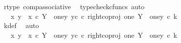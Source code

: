 \begin{isabellebody}
\ r{\isacharunderscore}{\kern0pt}type\ comp{\isacharunderscore}{\kern0pt}associative{}\ \isamarkupfalse%
\ {\isacharparenleft}{\kern0pt}typecheck{\isacharunderscore}{\kern0pt}cfuncs{\isacharcomma}{\kern0pt}\ auto{\isacharparenright}{\kern0pt}\isanewline
\ \ \ \ \ \ \ \ \ \ \ \ \isamarkupfalse%
\ \isamarkupfalse%
\ {\isachardoublequoteopen}{\isachardot}{\kern0pt}{\isachardot}{\kern0pt}{\isachardot}{\kern0pt}\ {\isacharequal}{\kern0pt}\ {\isacharparenleft}{\kern0pt}{\isasymlangle}x{}{\isacharcomma}{\kern0pt}\ y{}{\isasymrangle}\ {\isasymamalg}\ {\isasymlangle}x{}\ {\isasymcirc}\isactrlsub c\ {\isasymbeta}\isactrlbsub Y\ {\isasymsetminus}\ {\isacharparenleft}{\kern0pt}one{\isacharcomma}{\kern0pt}y{}{\isacharparenright}{\kern0pt}\isactrlesub {\isacharcomma}{\kern0pt}\ y{}\isactrlsup c{\isasymrangle}{\isacharparenright}{\kern0pt}\ {\isasymcirc}\isactrlsub c\ {\isacharparenleft}{\kern0pt}right{\isacharunderscore}{\kern0pt}coproj\ one\ {\isacharparenleft}{\kern0pt}Y\ {\isasymsetminus}\ {\isacharparenleft}{\kern0pt}one{\isacharcomma}{\kern0pt}y{}{\isacharparenright}{\kern0pt}{\isacharparenright}{\kern0pt}\ {\isasymcirc}\isactrlsub c\ k{\isacharparenright}{\kern0pt}{\isachardoublequoteclose}\isanewline
\ \ \ \ \ \ \ \ \ \ \ \ \ \ \isamarkupfalse%
\ k{\isacharunderscore}{\kern0pt}def\ \isamarkupfalse%
\ auto\isanewline
\ \ \ \ \ \ \ \ \ \ \ \ \isamarkupfalse%
\ \isamarkupfalse%
\ {\isachardoublequoteopen}{\isachardot}{\kern0pt}{\isachardot}{\kern0pt}{\isachardot}{\kern0pt}\ {\isacharequal}{\kern0pt}\ {\isacharparenleft}{\kern0pt}{\isacharparenleft}{\kern0pt}{\isasymlangle}x{}{\isacharcomma}{\kern0pt}\ y{}{\isasymrangle}\ {\isasymamalg}\ {\isasymlangle}x{}\ {\isasymcirc}\isactrlsub c\ {\isasymbeta}\isactrlbsub Y\ {\isasymsetminus}\ {\isacharparenleft}{\kern0pt}one{\isacharcomma}{\kern0pt}y{}{\isacharparenright}{\kern0pt}\isactrlesub {\isacharcomma}{\kern0pt}\ y{}\isactrlsup c{\isasymrangle}{\isacharparenright}{\kern0pt}\ {\isasymcirc}\isactrlsub c\ right{\isacharunderscore}{\kern0pt}coproj\ one\ {\isacharparenleft}{\kern0pt}Y\ {\isasymsetminus}\ {\isacharparenleft}{\kern0pt}one{\isacharcomma}{\kern0pt}y{}{\isacharparenright}{\kern0pt}{\isacharparenright}{\kern0pt}{\isacharparenright}{\kern0pt}\ {\isasymcirc}\isactrlsub c\ k{\isachardoublequoteclose}\isanewline
\ \ \ \ \ \ \ \ \ \ \ \ \ \ \isamarkupfalse%

\end{isabellebody}
